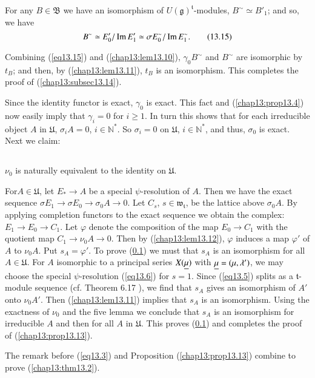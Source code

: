 For any $B \in \mathfrak{B}$ we have an isomorphism of
$U(\mathfrak{g})^\mathfrak{t}$-modules, $B^\sim \simeq B'_1$; and so,
we have 
\begin{equation*}
B^\sim \simeq E'_0 / \operatorname{Im} E'_1 \simeq \sigma E^\sim_0 / \operatorname{Im} E^\sim_1.
\tag{13.15}\label{eq13.15}
\end{equation*}

Combining (\ref{eq13.15}) and (\ref{chap13:lem13.10}), $\gamma_0 B^\sim$ and $B^\sim$ are
isomorphic by $t_B$; and then, by (\ref{chap13:lem13.11}), $t_B$ is an
isomorphism. This completes the proof of (\ref{chap13:subsec13.14}). 

Since the identity functor is exact, $\gamma_0$ is exact. This fact
and (\ref{chap13:prop13.4}) now easily imply that $\gamma_i = 0$ for $i \geq 1$. In
turn this shows that for each irreducible object $A$ in
$\mathfrak{U}$, $\sigma_i A = 0$, $i \in \mathbb{N}^*$. So $\sigma_i
=0$ on $\mathfrak{U}$, $i \in \mathbb{N}^*$, and thus, $\sigma_0$ is
exact. Next we claim: 


\setcounter{subsection}{15}
\subsection{}\label{chap13:subsec13.16}
$\nu_0$ is naturally equivalent to the identity on $\mathfrak{U}$. 

For\pageoriginale $A \in \mathfrak{U}$, let $E_* \to A$ be a special
$\psi$-resolution of $A$. Then we have the exact sequence $\sigma E_1
\to \sigma E_0 \to \sigma_0 A \to 0$. Let $C_s$, $s \in
\mathfrak{w}_\mathfrak{t}$, be the lattice above $\sigma_0 A$. By
applying completion functors to the exact sequence we obtain the
complex: $E_1 \to E_0 \to C_1$. Let $\varphi$ denote the composition
of the map $E_0 \to C_1$ with the quotient map $C_1 \to \nu_0 A \to
0$. Then by (\ref{chap13:lem13.12}), $\varphi$ induces a map $\varphi'$ of $A$ to
$\nu_0 A$. Put $s_A = \varphi'$. To prove (\ref{chap13:subsec13.16}) we must that $s_A$
is an isomorphism for all $A \in\mathfrak{U}$. For $A$ isomorphic to a
principal series $X(\underline{\mu})$ with $\underline{\mu} = (\mu, \lambda')$, we may
choose the special $\psi$-resolution (\ref{eq13.6}) for $s
= 1$. Since (\ref{eq13.5}) 
splits as a $\mathfrak{t}$-module sequence (cf. Theorem 6.17
\cite{key15}), we find that $s_A$ gives an isomorphism of $A'$ onto
$\nu_0 A'$. Then (\ref{chap13:lem13.11}) implies that $s_A$ is an isomorphism. Using
the exactness of $\nu_0$ and the five lemma we conclude that $s_A$ is
an isomorphism for irreducible $A$ and then for all $A$ in
$\mathfrak{U}$. This proves (\ref{chap13:subsec13.16}) and completes the proof of
(\ref{chap13:prop13.13}).


\medskip
{}
The remark before (\ref{eq13.3}) and Proposition
(\ref{chap13:prop13.13}) combine to prove 
(\ref{chap13:thm13.2}). 


